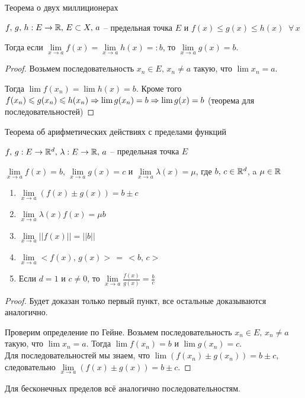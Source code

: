 \begin{theorem-non}
    Теорема о двух миллиционерах

    $f, \, g, \, h : E \to \mathbb{R}, \, E \subset X, \, a$ -- предельная точка $E$ и $f(x) \leqslant g(x) \leqslant h(x) \;\; \forall \, x$

    Тогда если $\lim\limits_{x \to a} f(x) = \lim\limits_{x \to a} h(x) =: b$, то $\lim\limits_{x \to a} g(x) = b$.
\end{theorem-non}
\begin{proof}
    Возьмем последовательность $x_n \in E, \, x_n \neq a$ такую, что $\lim x_n = a$. 

    Тогда $\lim f(x_n) = \lim h(x) = b$. Кроме того $f(x_n) \leqslant g(x_n) \leqslant h(x_n) \Rightarrow \lim g(x_n) = b \\ \Rightarrow \lim g(x) = b$
    (теорема для последовательностей)
\end{proof}

\begin{theorem-non}
    Теорема об арифметических действиях с пределами функций

    $f, \, g : E \to \mathbb{R}^d, \, \lambda : E \to \mathbb{R}, \, a$ -- предельная точка $E$

    $\lim\limits_{x \to a} f(x) = b, \, \lim\limits_{x \to a} g(x) = c$ и $\lim\limits_{x \to a} \lambda(x) = \mu$, где $b, \, c \in \mathbb{R}^d$, a $\mu \in \mathbb{R}$
    \begin{enumerate}
        \item $\lim\limits_{x \to a} (f(x) \pm g(x)) = b \pm c$
        \item $\lim\limits_{x \to a} \lambda(x)f(x) = \mu b$
        \item $\lim\limits_{x \to a} ||f(x)|| = ||b||$
        \item $\lim\limits_{x \to a} <f(x), \, g(x)> \, = \, <b, \, c>$
        \item Если $d = 1$ и $c \neq 0$, то $\lim\limits_{x \to a} \frac{f(x)}{g(x)} = \frac{b}{c}$
    \end{enumerate}
\end{theorem-non}
\begin{proof}
    Будет доказан только первый пункт, все остальные доказываются аналогично.

    Проверим определение по Гейне. Возьмем последовательность $x_n \in E, \, x_n \neq a$ такую, что $\lim x_n = a$.
    Тогда $\lim f(x_n) = b$ и $\lim g(x_n) = c$. \\
    Для последовательностей мы знаем, что $\lim (f(x_n) \pm g(x_n)) = b \pm c$, следовательно $\lim\limits_{x \to a} (f(x) \pm g(x)) = b \pm c$.
\end{proof}
\begin{notice}
    Для бесконечных пределов всё аналогично последовательностям.
\end{notice}

